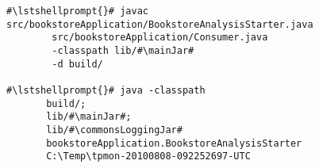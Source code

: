 \begin{lstlisting}[caption=Commands to compile and run the analysis under Windows,label=lst:bookstoreAnalysisStarterWin] 			
#\lstshellprompt{}# javac src/bookstoreApplication/BookstoreAnalysisStarter.java 
        src/bookstoreApplication/Consumer.java
        -classpath lib/#\mainJar#
        -d build/

#\lstshellprompt{}# java -classpath 
       build/;
       lib/#\mainJar#;
       lib/#\commonsLoggingJar#
       bookstoreApplication.BookstoreAnalysisStarter 
       C:\Temp\tpmon-20100808-092252697-UTC
\end{lstlisting}	
